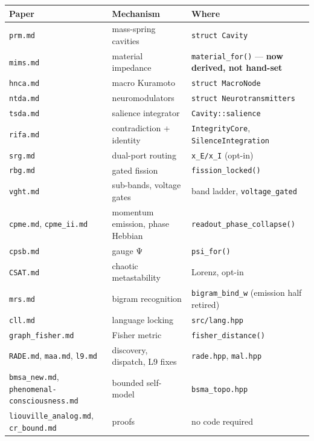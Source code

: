 \documentclass[
  11pt,
  a4paper,
]{article}
\begin{document}
\begin{longtable}[]{@{}
  >{\raggedright\arraybackslash}p{}
  >{\raggedright\arraybackslash}p{}
  >{\raggedright\arraybackslash}p{}@{}}
\toprule\noalign{}
\begin{minipage}[b]{\linewidth}\raggedright
Paper
\end{minipage} & \begin{minipage}[b]{\linewidth}\raggedright
Mechanism
\end{minipage} & \begin{minipage}[b]{\linewidth}\raggedright
Where
\end{minipage} \\
\midrule\noalign{}
\endhead
\bottomrule\noalign{}
\endlastfoot
\texttt{prm.md} & mass-spring cavities & \texttt{struct\ Cavity} \\
\texttt{mims.md} & material impedance & \texttt{material\_for()} ---
\textbf{now derived, not hand-set} \\
\texttt{hnca.md} & macro Kuramoto & \texttt{struct\ MacroNode} \\
\texttt{ntda.md} & neuromodulators &
\texttt{struct\ Neurotransmitters} \\
\texttt{tsda.md} & salience integrator & \texttt{Cavity::salience} \\
\texttt{rifa.md} & contradiction + identity & \texttt{IntegrityCore},
\texttt{SilenceIntegration} \\
\texttt{srg.md} & dual-port routing & \texttt{x\_E/x\_I} (opt-in) \\
\texttt{rbg.md} & gated fission & \texttt{fission\_locked()} \\
\texttt{vght.md} & sub-bands, voltage gates & band ladder,
\texttt{voltage\_gated} \\
\texttt{cpme.md}, \texttt{cpme\_ii.md} & momentum emission, phase
Hebbian & \texttt{readout\_phase\_collapse()} \\
\texttt{cpsb.md} & gauge Ψ & \texttt{psi\_for()} \\
\texttt{CSAT.md} & chaotic metastability & Lorenz, opt-in \\
\texttt{mrs.md} & bigram recognition & \texttt{bigram\_bind\_w}
(emission half retired) \\
\texttt{cll.md} & language locking & \texttt{src/lang.hpp} \\
\texttt{graph\_fisher.md} & Fisher metric &
\texttt{fisher\_distance()} \\
\texttt{RADE.md}, \texttt{maa.md}, \texttt{l9.md} & discovery, dispatch,
L9 fixes & \texttt{rade.hpp}, \texttt{mal.hpp} \\
\texttt{bmsa\_new.md}, \texttt{phenomenal-consciousness.md} & bounded
self-model & \texttt{bsma\_topo.hpp} \\
\texttt{liouville\_analog.md}, \texttt{cr\_bound.md} & proofs & no code
required \\
\end{longtable}
\end{document}
